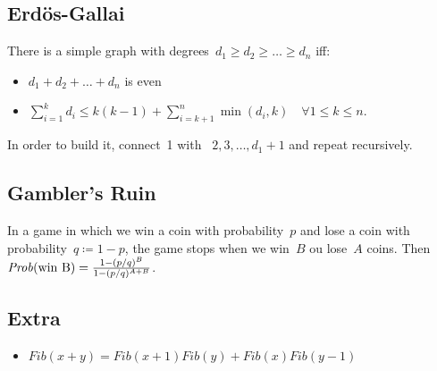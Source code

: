\subsection{Erdös-Gallai}
There is a simple graph with degrees~$d_1 \geq d_2 \geq \ldots \geq d_n$ iff:
\begin{itemize}
\item $d_1 + d_2 + \ldots + d_n$ is even
\item $\sum\limits_{i = 1}^k{d_i} \leq k(k-1) + \sum\limits_{i=k+1}^n{\min(d_i, k)} \quad \forall 1 \leq k \leq n$.
\end{itemize}
In order to build it, connect~1 with ~$2, 3, \ldots, d_1 + 1$ and repeat recursively.

\subsection{Gambler's Ruin}
In a game in which we win a coin with probability~$p$ and lose a coin with probability~$q \coloneqq 1 - p$, the game stops when we win~$B$ ou lose~$A$ coins. Then~$\mathit{Prob}(\textnormal{win B}) = \frac{1 - (p/q)^B}{1 - (p/q)^{A+B}}$.

\subsection{Extra}
\newcommand{\Fib}{\mathit{Fib}}
\begin{itemize}
\item $\Fib(x + y) = \Fib(x + 1) \Fib(y) + \Fib(x) \Fib(y - 1)$
\end{itemize}
